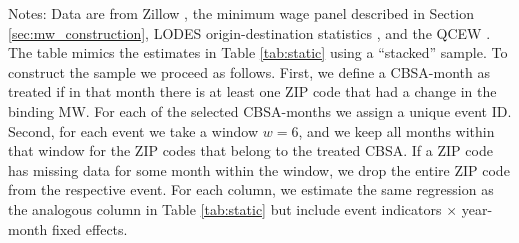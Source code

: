 \begin{table}[hbt!]
    \begin{minipage}{.95\textwidth} \footnotesize
        \vspace{2mm}
        Notes: 
        Data are from Zillow \parencite{ZillowData}, 
        the minimum wage panel described in Section \ref{sec:mw_construction}, 
        LODES origin-destination statistics \parencite{CensusLODES},
        and the QCEW \parencite{QCEW}.
        The table mimics the estimates in Table \ref{tab:static} using a 
        ``stacked'' sample.
        To construct the sample we proceed as follows.
        First, we define a CBSA-month as treated if in that month there is at 
        least one ZIP code that had a change in the binding MW.
        For each of the selected CBSA-months we assign a unique event ID. 
        Second, for each event we take a window $w = 6$, and we keep all months 
        within that window for the ZIP codes that belong to the treated CBSA.
        If a ZIP code has missing data for some month within the window, we drop 
        the entire ZIP code from the respective event.
        For each column, we estimate the same regression as the analogous column 
        in Table \ref{tab:static} but include event indicators $\times$ year-month
        fixed effects.
    \end{minipage}
\end{table}
